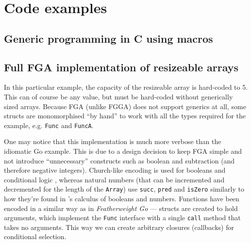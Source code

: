 \section{Code examples}

\subsection{Generic programming in C using macros}
\label{sec:generic-c}




\subsection{Full FGA implementation of resizeable arrays}
\label{sec:fg-resizable-array-code}

In this particular example, the capacity of the resizeable array is hard-coded
to 5. This can of course be any value, but must be hard-coded without
generically sized arrays. Because FGA (unlike FGGA) does not support generics at
all, some structs are monomorphised ``by hand'' to work with all the types
required for the example, e.g. \texttt{Func} and \texttt{FuncA}.

One may notice that this implementation is much more verbose than the idiomatic
Go example. This is due to a design decision to keep FGA simple and not
introduce ``unnecessary'' constructs such as boolean and subtraction (and
therefore negative integers). Church-like encoding is used for booleans and
conditional logic \autocite{lambdaCalculus}, whereas natural numbers (that can
be incremented and decremented for the length of the \texttt{Array}) use
\texttt{succ}, \texttt{pred} and \texttt{isZero} similarly to how they're found
in \textcite{tapl}'s calculus of booleans and numbers. Functions have been
encoded in a similar way as in \emph{Featherweight Go} \autocite{fg} --- structs
are created to hold arguments, which implement the \texttt{Func} interface with
a single \texttt{call} method that takes no arguments. This way we can create
arbitrary closures (callbacks) for conditional selection.

\clearpage

